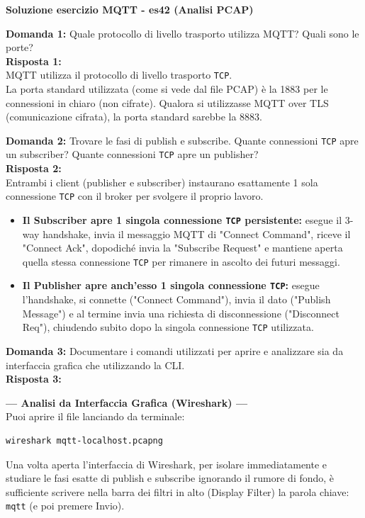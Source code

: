 \documentclass[11pt]{article}
\begin{document}
\begin{tcolorbox}[colback=green!5!white,colframe=green!75!black,title=\textbf{RISPOSTA}, breakable]
\textbf{Soluzione esercizio MQTT - es42 (Analisi PCAP)}

\textbf{Domanda 1:} Quale protocollo di livello trasporto utilizza MQTT? Quali sono le porte?\\
\textbf{Risposta 1:}\\
MQTT utilizza il protocollo di livello trasporto \texttt{TCP}.\\
La porta standard utilizzata (come si vede dal file PCAP) è la 1883 per le connessioni in chiaro (non cifrate). Qualora si utilizzasse MQTT over TLS (comunicazione cifrata), la porta standard sarebbe la 8883.

\textbf{Domanda 2:} Trovare le fasi di publish e subscribe. Quante connessioni \texttt{TCP} apre un subscriber? Quante connessioni \texttt{TCP} apre un publisher?\\
\textbf{Risposta 2:}\\
Entrambi i client (publisher e subscriber) instaurano esattamente 1 sola connessione \texttt{TCP} con il broker per svolgere il proprio lavoro.
\begin{itemize}
    \item \textbf{Il Subscriber apre 1 singola connessione \texttt{TCP} persistente:} esegue il 3-way handshake, invia il messaggio MQTT di "Connect Command", riceve il "Connect Ack", dopodiché invia la "Subscribe Request" e mantiene aperta quella stessa connessione \texttt{TCP} per rimanere in ascolto dei futuri messaggi.
    \item \textbf{Il Publisher apre anch'esso 1 singola connessione \texttt{TCP}:} esegue l'handshake, si connette ("Connect Command"), invia il dato ("Publish Message") e al termine invia una richiesta di disconnessione ("Disconnect Req"), chiudendo subito dopo la singola connessione \texttt{TCP} utilizzata.
\end{itemize}

\textbf{Domanda 3:} Documentare i comandi utilizzati per aprire e analizzare sia da interfaccia grafica che utilizzando la CLI.\\
\textbf{Risposta 3:}

\textbf{--- Analisi da Interfaccia Grafica (Wireshark) ---}\\
Puoi aprire il file lanciando da terminale:
\begin{lstlisting}[language=bash, basicstyle=\ttfamily\small]
wireshark mqtt-localhost.pcapng
\end{lstlisting}
Una volta aperta l'interfaccia di Wireshark, per isolare immediatamente e studiare le fasi esatte di publish e subscribe ignorando il rumore di fondo, è sufficiente scrivere nella barra dei filtri in alto (Display Filter) la parola chiave:
\texttt{mqtt}
(e poi premere Invio).


\end{tcolorbox}
\end{document}
